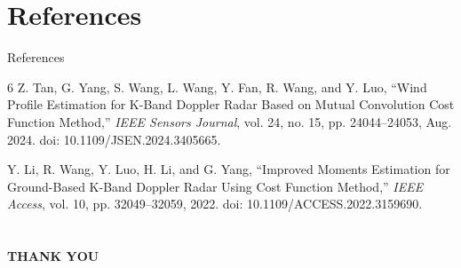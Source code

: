 \documentclass[10.5pt]{beamer}
\begin{document}
    

\section*{References}
\begin{frame}[allowframebreaks]{References}
\begin{thebibliography}{6}
Z. Tan, G. Yang, S. Wang, L. Wang, Y. Fan, R. Wang, and
Y. Luo, ``Wind Profile Estimation for K-Band Doppler Radar
Based on Mutual Convolution Cost Function Method,''
\textit{IEEE Sensors Journal}, vol. 24, no. 15,
pp. 24044--24053, Aug. 2024.
doi: 10.1109/JSEN.2024.3405665.

 

Y. Li, R. Wang, Y. Luo, H. Li, and G. Yang,
``Improved Moments Estimation for Ground-Based K-Band
Doppler Radar Using Cost Function Method,''
\textit{IEEE Access}, vol. 10, pp. 32049--32059, 2022.
doi: 10.1109/ACCESS.2022.3159690.

\end{thebibliography}

\end{frame}
\section{}
\begin{frame}{}
    \centering
    \huge{\textbf{THANK YOU}}
\end{frame}
\end{document}

